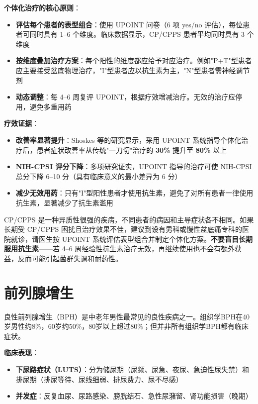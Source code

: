 \documentclass[12pt,a4paper,twoside]{ctexbook}
\begin{document}
\textbf{个体化治疗的核心原则}：
\begin{itemize}[leftmargin=2cm]
	\item \textbf{评估每个患者的表型组合}：使用 UPOINT 问卷（6 项 yes/no 评估），每位患者可同时具有 1--6 个维度。临床数据显示，CP/CPPS 患者平均同时具有 3 个维度
	\item \textbf{按维度叠加治疗方案}：每个阳性的维度都应给予对应治疗。例如"P+T"型患者应主要接受盆底物理治疗，"I"型患者应以抗生素为主，"N"型患者需神经调节剂
	\item \textbf{动态调整}：每 4--6 周复评 UPOINT，根据疗效增减治疗。无效的治疗应停用，避免多重用药
\end{itemize}

\textbf{疗效证据}：
\begin{itemize}[leftmargin=2cm]
	\item \textbf{改善率显著提升}：Shoskes 等的研究显示，采用 UPOINT 系统指导个体化治疗后，患者症状改善率从传统"一刀切"治疗的 \textbf{30\%} 提升至 \textbf{80\%} 以上
	\item \textbf{NIH-CPSI 评分下降}：多项研究证实，UPOINT 指导的治疗可使 NIH-CPSI 总分下降 6--10 分（具有临床意义的最小差异为 6 分）
	\item \textbf{减少无效用药}：只有"I"型阳性患者才使用抗生素，避免了对所有患者一律使用抗生素，显著减少了抗生素滥用
\end{itemize}

\begin{tcolorbox}[colback=pink!5!white,colframe=red!50!black,title=贴心小叮咛]
CP/CPPS 是一种异质性很强的疾病，不同患者的病因和主导症状各不相同。如果长期受 CP/CPPS 困扰且治疗效果不佳，建议到设有男科或慢性盆底痛专科的医院就诊，请医生按 UPOINT 系统评估表型组合并制定个体化方案。\textbf{不要盲目长期服用抗生素}——若 4--6 周经验性抗生素治疗无效，再继续使用也不会有额外获益，反而可能引起菌群失调和耐药性。
\end{tcolorbox}


\section{前列腺增生}


良性前列腺增生（BPH）是中老年男性最常见的良性疾病之一。组织学BPH在40岁男性约8\%，60岁约50\%，80岁以上超过80\%；但并非所有组织学BPH都有临床症状。

\textbf{临床表现}：
\begin{itemize}[leftmargin=2cm]
	\item \textbf{下尿路症状（LUTS）}：分为储尿期（尿频、尿急、夜尿、急迫性尿失禁）和排尿期（排尿等待、尿线细弱、排尿费力、尿不尽感）
	\item \textbf{并发症}：反复血尿、尿路感染、膀胱结石、急性尿潴留、肾功能损害（晚期）
\end{itemize}
\end{document}
